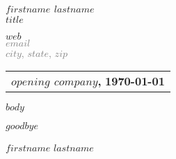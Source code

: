 \documentclass[$size$]{article}
\begin{document}
\begin{center}
    {\Large \textbf{$firstname$ $lastname$}}\\
    \textbf{$title$}
\end{center}

\bigskip

\noindent
\begin{flushright}
\textcolor{gray}
{
\href{$web$}{$web$} \\
$email$ \\
$city$, $state$, $zip$
}
\end{flushright}

\bigskip

\noindent
\begin{tabular}{@{}p{\textwidth}}
\textbf{$opening$ $company$,} \hfill \textbf{\today}
\end{tabular}

\bigskip

$body$

\bigskip

\noindent
$goodbye$

$firstname$ $lastname$

\bigskip

\noindent
\end{document}

